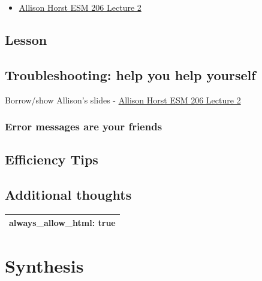 \documentclass[]{book}
\providecommand{\tightlist}{%
  \setlength{\itemsep}{0pt}\setlength{\parskip}{0pt}}
\begin{document}
\begin{itemize}
\tightlist
\item
  \href{https://docs.google.com/presentation/d/1u1DdhU_WTv1b-sbQgqVGAE-bA2Nq_Yym8BzcPW4lS3k/edit\#slide=id.g63942ead2d_0_219}{Allison Horst ESM 206 Lecture 2}
\end{itemize}

\hypertarget{lesson}{%
\section{Lesson}\label{lesson}}

\hypertarget{troubleshooting-help-you-help-yourself}{%
\section{Troubleshooting: help you help yourself}\label{troubleshooting-help-you-help-yourself}}

Borrow/show Allison's slides
- \href{https://docs.google.com/presentation/d/1u1DdhU_WTv1b-sbQgqVGAE-bA2Nq_Yym8BzcPW4lS3k/edit\#slide=id.g63942ead2d_0_219}{Allison Horst ESM 206 Lecture 2}

\hypertarget{error-messages-are-your-friends-1}{%
\subsection{Error messages are your friends}\label{error-messages-are-your-friends-1}}

\hypertarget{efficiency-tips-4}{%
\section{Efficiency Tips}\label{efficiency-tips-4}}

\hypertarget{additional-thoughts}{%
\section{Additional thoughts}\label{additional-thoughts}}

\begin{longtable}[]{@{}l@{}}
\toprule
\endhead
always\_allow\_html: true\tabularnewline
\bottomrule
\end{longtable}

\hypertarget{synthesis}{%
\chapter{Synthesis}\label{synthesis}}
\end{document}
